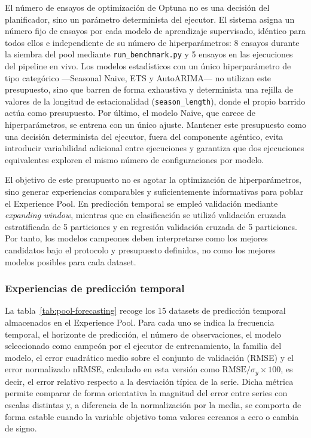 \documentclass[12pt,a4paper]{article}
\theoremstyle{plain}
\begin{document}
El número de ensayos de optimización de Optuna no es una decisión del planificador, sino un parámetro determinista del ejecutor. El sistema asigna un número fijo de ensayos por cada modelo de aprendizaje supervisado, idéntico para todos ellos e independiente de su número de hiperparámetros: 8 ensayos durante la siembra del pool mediante \texttt{run\_benchmark.py} y 5 ensayos en las ejecuciones del pipeline en vivo. Los modelos estadísticos con un único hiperparámetro de tipo categórico ---Seasonal Naive, ETS y AutoARIMA--- no utilizan este presupuesto, sino que barren de forma exhaustiva y determinista una rejilla de valores de la longitud de estacionalidad (\texttt{season\_length}), donde el propio barrido actúa como presupuesto. Por último, el modelo Naive, que carece de hiperparámetros, se entrena con un único ajuste. Mantener este presupuesto como una decisión determinista del ejecutor, fuera del componente agéntico, evita introducir variabilidad adicional entre ejecuciones y garantiza que dos ejecuciones equivalentes exploren el mismo número de configuraciones por modelo.

El objetivo de este presupuesto no es agotar la optimización de hiperparámetros, sino generar experiencias comparables y suficientemente informativas para poblar el Experience Pool. En predicción temporal se empleó validación mediante \textit{expanding window}, mientras que en clasificación se utilizó validación cruzada estratificada de 5 particiones y en regresión validación cruzada de 5 particiones. Por tanto, los modelos campeones deben interpretarse como los mejores candidatos bajo el protocolo y presupuesto definidos, no como los mejores modelos posibles para cada dataset.

\subsubsection{Experiencias de predicción temporal}
\label{sec:pool-forecasting}

La tabla~\ref{tab:pool-forecasting} recoge los 15 datasets de predicción temporal almacenados en el Experience Pool. Para cada uno se indica la frecuencia temporal, el horizonte de predicción, el número de observaciones, el modelo seleccionado como campeón por el ejecutor de entrenamiento, la familia del modelo, el error cuadrático medio sobre el conjunto de validación (RMSE) y el error normalizado nRMSE, calculado en esta versión como $\text{RMSE}/\sigma_y\times100$, es decir, el error relativo respecto a la desviación típica de la serie. Dicha métrica permite comparar de forma orientativa la magnitud del error entre series con escalas distintas y, a diferencia de la normalización por la media, se comporta de forma estable cuando la variable objetivo toma valores cercanos a cero o cambia de signo.
\end{document}
